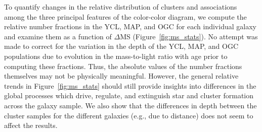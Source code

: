 \documentclass[linenumbers]{aastex63}
\begin{document}
To quantify changes in the relative distribution of clusters and associations among the three principal features of the color-color diagram, we compute the relative number fractions in the YCL, MAP, and OGC for each individual galaxy and examine them as a function of $\Delta$MS (Figure~\ref{fig:ms_stats}). No attempt was made to correct for the variation in the depth of the YCL, MAP, and OGC populations due to evolution in the mass-to-light ratio with age prior to computing these fractions.  Thus, the absolute values of the number fractions themselves may not be physically meaningful.  However, the general 
{relative} trends in Figure~\ref{fig:ms_stats} should still provide insights into differences in the global processes which drive, regulate, and extinguish star and cluster formation across the galaxy sample.  {We also show that the differences in depth between the cluster samples for the different galaxies (e.g., due to distance) does not seem to affect the results.}
\end{document}
